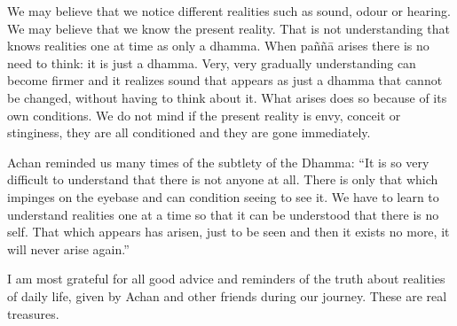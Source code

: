 We may believe that we notice different realities such as sound, odour or hearing. We 
may believe that we know the present reality. That is not understanding that knows 
realities one at time as only a dhamma. When paññā arises there is no need to think: it 
is just a dhamma. Very, very gradually understanding can become firmer and it realizes sound that appears as just a dhamma that cannot be changed, without having to 
think about it. What arises does so because of its own conditions. We do not mind if 
the present reality is envy, conceit or stinginess, they are all conditioned and they are 
gone immediately. 

Achan reminded us many times of the subtlety of the Dhamma: ``It is so very difficult to understand that there is not anyone at all. There is only that which impinges on 
the eyebase and can condition seeing to see it. We have to learn to understand realities one at a time so that it can be understood that there is no self. That which appears 
has arisen, just to be seen and then it exists no more, it will never arise again.'' 

I am most grateful for all good advice and reminders of the truth about realities of 
daily life, given by Achan and other friends during our journey. These are real treasures. 



